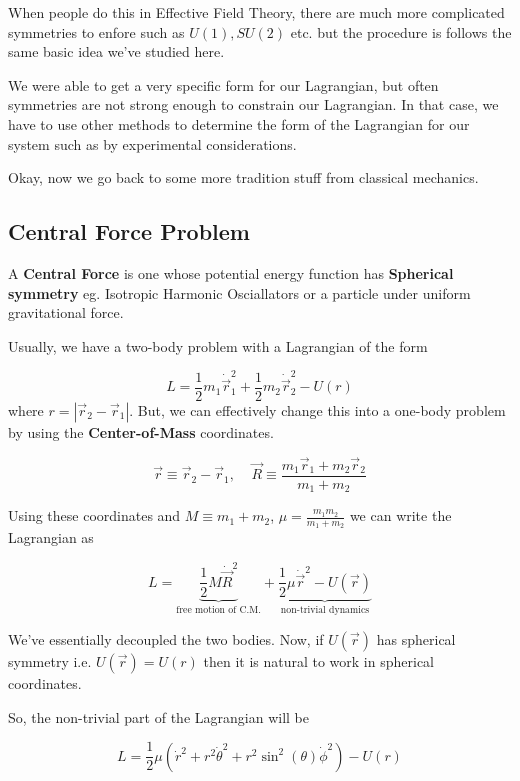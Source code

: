\documentclass[11pt]{article}
\begin{document}
\vskip 0.5cm
\begin{thought}
  {When people do this in Effective Field Theory, there are much more complicated symmetries to enfore such as $U(1), SU(2)$ etc. but the procedure is follows the same basic idea we've studied here.}
\end{thought}

\vskip 0.5cm
We were able to get a very specific form for our Lagrangian, but often symmetries are not strong enough to constrain our Lagrangian. In that case, we have to use other methods to determine the form of the Lagrangian for our system such as by experimental considerations.

\vskip 0.5cm
Okay, now we go back to some more tradition stuff from classical mechanics. 

\vskip 1cm
\subsection{Central Force Problem}

A \textbf{Central Force} is one whose potential energy function has \textbf{Spherical symmetry} eg. Isotropic Harmonic Osciallators or a particle under uniform gravitational force.

\vskip 0.5cm
Usually, we have a two-body problem with a Lagrangian of the form 

\[ L = \frac{1}{2} m_1 \dot{\vec{r}}_1^2 + \frac{1}{2} m_2 \dot{\vec{r}}_2^2 - U(r)\]
where $r = |\vec{r}_2 - \vec{r}_1|$. But, we can effectively change this into a one-body problem by using the \textbf{Center-of-Mass} coordinates.

\[ \vec{r} \equiv \vec{r}_2 - \vec{r}_1,\;\;\;\; \vec{R} \equiv \frac{m_1\vec{r}_1 + m_2 \vec{r}_2}{m_1 + m_2}  \]

Using these coordinates and $M \equiv m_1 + m_2$, $\mu = \frac{m_1m_2}{m_1 + m_2}$ we can write the Lagrangian as 

\[ L = \underbrace{\frac{1}{2} M \dot{\vec{R}}^2}_{\text{free motion of C.M.}} + \underbrace{\frac{1}{2}\mu \dot{\vec{r}}^2 - U(\vec{r})}_{\text{non-trivial dynamics}} \]

We've essentially decoupled the two bodies. Now, if $U(\vec{r})$ has spherical symmetry i.e. $U(\vec{r}) = U(r)$ then it is natural to work in spherical coordinates.

So, the non-trivial part of the Lagrangian will be 

\[ L = \frac{1}{2} \mu \left(\dot{r}^2 + r^2 \dot{\theta}^2 + r^2 \sin^2(\theta) \dot{\phi}^2 \right) - U(r) \]
\end{document}
